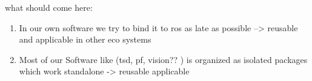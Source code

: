 what should come here:
\begin{enumerate}
	\item In our own software we try to bind it to ros as late as possible --> reusable and applicable in other eco systems
	\item Most of our Software like (tsd, pf, vision?? ) is organized as isolated packages which work standalone -> reusable applicable
\end{enumerate}